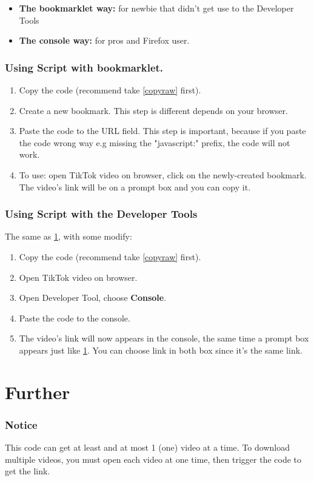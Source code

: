 \documentclass{article}
\begin{document}
\begin{itemize}
    \item \textbf{The bookmarklet way:} for newbie that didn't get use to the Developer Tools
    \item \textbf{The console way:} for pros and Firefox user.
\end{itemize}

\section{Using Script with bookmarklet.}\label{bookmarklet}
\begin{enumerate}
\item Copy the code (recommend take \ref{copyraw} first).
\item Create a new bookmark. This step is different depends on your browser.
\item Paste the code to the URL field. This step is important, because if you paste the code wrong way e.g missing the "javascript:" prefix, the code will not work.
\item To use: open TikTok video on browser, click on the newly-created bookmark. The video's link will be on a prompt box and you can copy it.
\end{enumerate}

\section{Using Script with the Developer Tools}
The same as \ref{bookmarklet}, with some modify:
\begin{enumerate}
\item Copy the code (recommend take \ref{copyraw} first).
\item Open TikTok video on browser.
\item Open Developer Tool, choose \textbf{Console}.
\item Paste the code to the console.
\item The video's link will now appears in the console, the same time a prompt box appears just like \ref{bookmarklet}. You can choose link in both box since it's the same link.
\end{enumerate}

\part{Further}
\section{Notice}
This code can get at least and at most 1 (one) video at a time. To download multiple videos, you must open each video at one time, then trigger the code to get the link.
\end{document}

